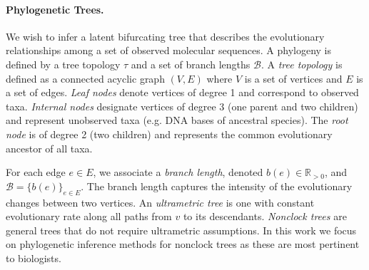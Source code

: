 \documentclass[accepted]{uai2021} %
\theoremstyle{definition}
\begin{document}
\paragraph{Phylogenetic Trees.}
We wish to infer a latent bifurcating tree that describes the evolutionary relationships among a set of observed molecular sequences. A phylogeny is defined by a tree topology $\tau$ and a set of branch lengths $\mathcal{B}$.
A \textit{tree topology} is defined as a connected acyclic graph $(V,E)$ where $V$ is a set of vertices and $E$ is a set of edges. \textit{Leaf nodes} denote vertices of degree 1 and correspond to observed taxa. \textit{Internal nodes} designate vertices of degree 3 (one parent and two children) and represent unobserved taxa (e.g. DNA bases of ancestral species). The \textit{root node} is of degree 2 (two children) and represents the common evolutionary ancestor of all taxa. 

For each edge $e \in E$, we associate a \textit{branch length}, denoted $b(e) \in \mathbb{R}_{>0}$, and $\mathcal{B} = \{b(e)\}_{e \in E}$. The branch length captures the intensity of the evolutionary changes between two vertices. %
An \textit{ultrametric tree} is one with constant evolutionary rate along all paths from $v$ to its descendants. %
\textit{Nonclock trees} are general trees that do not require ultrametric assumptions. In this work we focus on phylogenetic inference methods for nonclock trees as these are most pertinent to biologists. 
\end{document}
